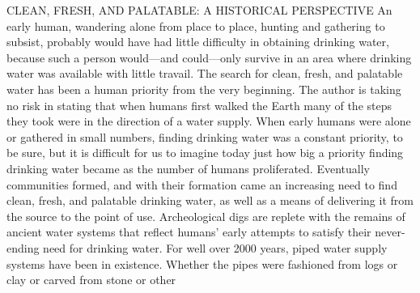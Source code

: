 \documentclass{article}
\begin{document}
CLEAN, FRESH, AND PALATABLE: A HISTORICAL PERSPECTIVE An early human,
wandering alone from place to place, hunting and gathering to subsist,
probably would have had little difficulty in obtaining drinking water,
because such a person would---and could---only survive in an area where
drinking water was available with little travail. The search for clean,
fresh, and palatable water has been a human priority from the very
beginning. The author is taking no risk in stating that when humans
first walked the Earth many of the steps they took were in the direction
of a water supply. When early humans were alone or gathered in small
numbers, finding drinking water was a constant priority, to be sure, but
it is difficult for us to imagine today just how big a priority finding
drinking water became as the number of humans proliferated. Eventually
communities formed, and with their formation came an increasing need to
find clean, fresh, and palatable drinking water, as well as a means of
delivering it from the source to the point of use. Archeological digs
are replete with the remains of ancient water systems that reflect
humans' early attempts to satisfy their never-ending need for drinking
water. For well over 2000 years, piped water supply systems have been in
existence. Whether the pipes were fashioned from logs or clay or carved
from stone or other
\end{document}

